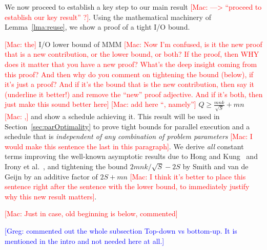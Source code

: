 \documentclass[sigplan,review,anonymous]{acmart}\settopmatter{printfolios=true,printccs=false,printacmref=false}
\newcommand\greg[1]{\textcolor{blue}{[Greg: #1]}}
\newcommand\mac[1]{\textcolor{red}{[Mac: #1]}}
\begin{document}
We now proceed to establish a key step to our main result \mac{---> ``proceed
to establish our key result'' ?}. Using the mathematical machinery of 
Lemma~\ref{lma:reuse}, we show a proof of a tight I/O bound.

\mac{the} I/O lower bound of MMM \mac{Now I'm confused, is it the
new proof that is a new contribution, or the lower bound, or both? If the
proof, then WHY does it matter that you have a new proof? What's the deep
insight coming from this proof? And then why do you comment on tightening the
bound (below), if it's just a proof? And if it's the bound that is the new
contribution, then say it (underline it better!) and remove the ``new'' proof
adjective. And if it's both, then just make this sound better here} \mac{add
here ``, namely''} $Q \ge \frac{mnk}{\sqrt{S}} + mn$ \mac{,} and show a
schedule achieving it. This result will be used in
Section~\cref{sec:parOptimality} to prove tight bounds for parallel execution
and a schedule that is \emph{independent of any combination of problem
parameters} \mac{I would make this sentence the last in this paragraph}.
%
We derive \emph{all} constant terms improving the well-known asymptotic results
due to Hong and Kung~\cite{redblue} and Irony et al.~\cite{IronyMMM}, and
tightening the bound $2mnk/\sqrt{S} - 2S$ by Smith and van de Geijn by an
additive factor of $2S + mn$ \mac{I think it's better to place this sentence
right after the sentence with the lower bound, to immediately justify why this
new result matters}.

\mac{Just in case, old beginning is below, commented}
%   


\greg{commented out the whole subsection Top-down vs bottom-up. It is mentioned 
in the intro and not needed here at all.}
\end{document}
